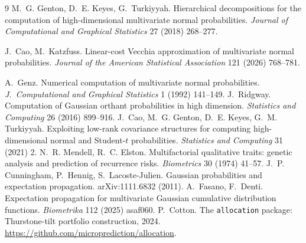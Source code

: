 \documentclass[12pt]{article}
\theoremstyle{remark}
\begin{document}
\begin{thebibliography}{9}
M.~G. Genton, D.~E. Keyes, G.~Turkiyyah. Hierarchical decompositions for
the computation of high-dimensional multivariate normal probabilities.
\emph{Journal of Computational and Graphical Statistics} 27 (2018)
268--277.

 J.~Cao, M.~Katzfuss.
Linear-cost Vecchia approximation of multivariate normal probabilities.
\emph{Journal of the American Statistical Association} 121 (2026)
768--781.

 A.~Genz. Numerical computation of multivariate normal
probabilities. \emph{J.\ Computational and Graphical Statistics} 1 (1992)
141--149.
 J.~Ridgway. Computation of Gaussian orthant
probabilities in high dimension. \emph{Statistics and Computing} 26 (2016)
899--916.
 J.~Cao, M.~G. Genton, D.~E. Keyes, G.~M. Turkiyyah.
Exploiting low-rank covariance structures for computing high-dimensional
normal and Student-$t$ probabilities. \emph{Statistics and Computing} 31
(2021) 2.
 N.~R. Mendell, R.~C. Elston. Multifactorial
qualitative traits: genetic analysis and prediction of recurrence risks.
\emph{Biometrics} 30 (1974) 41--57.
 J.~P. Cunningham, P.~Hennig, S.~Lacoste-Julien.
Gaussian probabilities and expectation propagation. arXiv:1111.6832 (2011).
 A.~Fasano, F.~Denti. Expectation propagation for
multivariate Gaussian cumulative distribution functions.
\emph{Biometrika} 112 (2025) asaf060.
 P.~Cotton. The
\texttt{allocation} package: Thurstone-tilt portfolio construction,
2024. \url{https://github.com/microprediction/allocation}.
\end{thebibliography}
\end{document}

